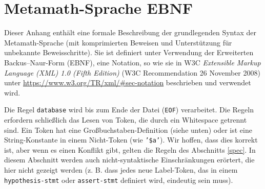 \chapter{Metamath-Sprache EBNF}%
\label{BNF}%

Dieser Anhang enthält eine formale Beschreibung der grundlegenden Syntax der Metamath-Sprache (mit komprimierten Beweisen und Unterstützung für unbekannte Beweisschritte). Sie ist definiert unter Verwendung der Erweiterten Backus--Naur-Form (EBNF), eine Notation, so wie sie in W3C \textit{Extensible Markup Language (XML) 1.0 (Fifth Edition)} (W3C Recommendation 26 November 2008) unter \url{https://www.w3.org/TR/xml/#sec-notation} beschrieben und verwendet wird. 

Die Regel \texttt{database} wird bis zum Ende der Datei (\texttt{EOF}) verarbeitet. Die Regeln erfordern schließlich das Lesen von Token, die durch ein Whitespace getrennt sind. Ein Token hat eine Großbuchstaben-Definition (siehe unten) oder ist eine String-Konstante in einem Nicht-Token (wie \texttt{'\$a'}). Wir hoffen, dass dies korrekt ist, aber wenn es einen Konflikt gibt, gelten die Regeln des Abschnitts \ref{spec}. In diesem Abschnitt werden auch nicht-syntaktische Einschränkungen erörtert, die hier nicht gezeigt werden (z. B. dass jedes neue Label-Token, das in einem \texttt{hypothesis-stmt} oder \texttt{assert-stmt} definiert wird, eindeutig sein muss). 

